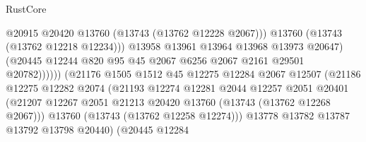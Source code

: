 \begin{lexlean}{RustCore}
\begin{coremodule}
                                            @20915
                                            @20420
                                            @13760
                                            (@13743 (@13762 @12228 @2067)))
                                          @13760
                                          (@13743 (@13762 @12218 @12234)))
                                        @13958
                                        @13961
                                        @13964
                                        @13968
                                        @13973
                                        @20647)
                                      (@20445
                                        @12244
                                        @820
                                        @95
                                        @45
                                        @2067
                                        @6256
                                        @2067
                                        @2161
                                        @29501
                                        @20782))))))
                            (@21176
                              @1505
                              @1512
                              @45
                              @12275
                              @12284
                              @2067
                              @12507
                              (@21186
                                @12275
                                @12282
                                @2074
                                (@21193
                                  @12274
                                  @12281
                                  @2044
                                  @12257
                                  @2051
                                  @20401
                                  (@21207
                                    @12267
                                    @2051
                                    @21213
                                    @20420
                                    @13760
                                    (@13743 (@13762 @12268 @2067)))
                                  @13760
                                  (@13743 (@13762 @12258 @12274)))
                                @13778
                                @13782
                                @13787
                                @13792
                                @13798
                                @20440)
                              (@20445
                                @12284

\end{coremodule}
\end{lexlean}
